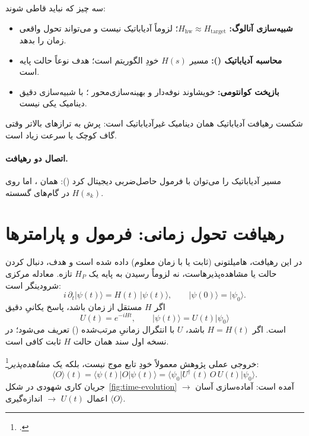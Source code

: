 سه چیز که نباید قاطی شوند:
\begin{itemize}
	\item \textbf{شبیه‌سازی آنالوگ:} $H_{\mathrm{hw}}\approx H_{\mathrm{target}}$؛ لزوماً آدیاباتیک نیست و می‌تواند تحول واقعی زمان را بدهد.
	\item \textbf{محاسبه آدیاباتیک ():} مسیر $H(s)$ خودِ الگوریتم است؛ هدف نوعاً حالت پایه است.
	\item \textbf{بازپخت کوانتومی:} خویشاوند نوفه‌دار و بهینه‌سازی‌محور ؛ با شبیه‌سازی دقیق دینامیک یکی نیست.
\end{itemize}
شکست رهیافت آدیاباتیک همان دینامیک غیرآدیاباتیک است: پرش به ترازهای بالاتر وقتی گاف کوچک یا سرعت زیاد است.

\paragraph{اتصال دو رهیافت.}
مسیر آدیاباتیک را می‌توان با فرمول حاصل‌ضربی دیجیتال کرد (): همان ، اما روی $H(s_k)$ در گام‌های گسسته.

\section{رهیافت تحول زمانی: فرمول و پارامترها}
\label{sec:time-evolution}

در این رهیافت، هامیلتونی (ثابت یا با زمان معلوم) داده شده است و هدف، دنبال کردن حالت یا مشاهده‌پذیرهاست، نه لزوماً رسیدن به پایه یک $H_P$ تازه. معادله مرکزی شرودینگر است:
\begin{equation}
	\label{eq:schrodinger}
	i\,\partial_t\lvert\psi(t)\rangle = H(t)\,\lvert\psi(t)\rangle,
	\qquad
	\lvert\psi(0)\rangle=\lvert\psi_0\rangle.
\end{equation}
اگر $H$ مستقل از زمان باشد، پاسخ یکانیِ دقیق
\begin{equation}
	\label{eq:U-of-t}
	U(t)=e^{-iHt},
	\qquad
	\lvert\psi(t)\rangle=U(t)\lvert\psi_0\rangle
\end{equation}
است. اگر $H=H(t)$ باشد، $U$ با انتگرال زمانیِ مرتب‌شده () تعریف می‌شود؛ در نسخه اول سند همان حالت $H$ ثابت کافی است.

خروجی عملی پژوهش معمولاً خودِ تابع موج نیست، بلکه یک \emph{مشاهده‌پذیر}\footnote{.}:
\begin{equation}
	\label{eq:obs}
	\langle O\rangle(t)
	=
	\langle\psi(t)\rvert O\lvert\psi(t)\rangle
	=
	\langle\psi_0\rvert U^\dagger(t)\,O\,U(t)\lvert\psi_0\rangle.
\end{equation}
جریان کاری شهودی در شکل~\ref{fig:time-evolution} آمده است: آماده‌سازی آسان $\to$ اعمال $U(t)$ $\to$ اندازه‌گیری $\langle O\rangle$.

